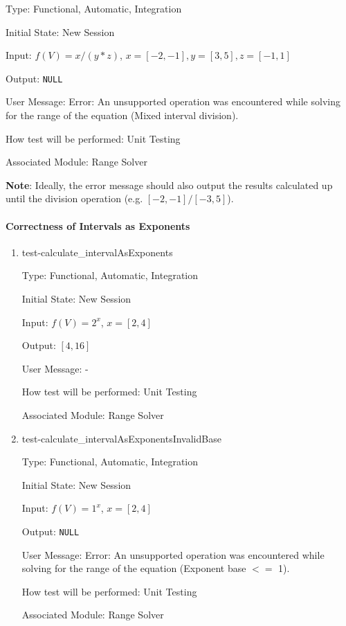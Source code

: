 \documentclass[12pt, titlepage]{article}
\begin{document}
\begin{enumerate}
	Type: Functional, Automatic, Integration
	
	Initial State: New Session
	
	Input: $f(V) = x / (y * z)$, $x = [-2,-1], y = [3,5], z = [-1,1]$
	
	Output: \texttt{NULL}
	
	User Message: Error: An unsupported operation was encountered while solving 
	for the range of the equation (Mixed interval division).
	
	How test will be performed: Unit Testing
	
	Associated Module: Range Solver
	
	\textbf{Note}: Ideally, the error message should also output the results 
	calculated up until the division operation (e.g. $[-2,-1]/[-3,5]$).\\
	
\end{enumerate}

\paragraph{Correctness of Intervals as Exponents}


\begin{enumerate}
	
	\item{test-calculate\_intervalAsExponents}
	
	Type: Functional, Automatic, Integration
	
	Initial State: New Session
	
	Input: $f(V) = 2^x$, $x = [2,4]$
	
	Output: $[4,16]$
	
	User Message: - 
	
	How test will be performed: Unit Testing
	
	Associated Module: Range Solver\\
	
	\item{test-calculate\_intervalAsExponentsInvalidBase}
	
	Type: Functional, Automatic, Integration
	
	Initial State: New Session
	
	Input: $f(V) = 1^x$, $x = [2,4]$
	
	Output: \texttt{NULL}
	
	User Message: Error: An unsupported operation was encountered while solving 
	for the range of the equation (Exponent base $<=$ 1).
	
	How test will be performed: Unit Testing
	
	Associated Module: Range Solver\\
	
\end{enumerate}
\end{document}
